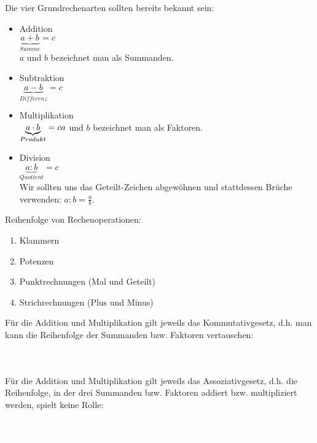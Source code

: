 Die vier Grundrechenarten sollten bereits bekannt sein:
\begin{tcolorbox}
	\begin{itemize}
		\item Addition\\\textcolor{loestc}{\(\underbrace{a+b}_{Summe}=c\)\\\(a\) und \(b\) bezeichnet man als Summanden.}
		\item Subtraktion\\\textcolor{loestc}{\(\underbrace{a-b}_{Differenz}=c\)}
		\item Multiplikation\\\textcolor{loestc}{\(\underbrace{a\cdot b}_{Produkt}=c$\\\(a\) und \(b\) bezeichnet man als Faktoren.}
		\item Division\\\textcolor{loestc}{\(\underbrace{a:b}_{Quotient}=c\)\\Wir sollten uns das Geteilt-Zeichen abgewöhnen und stattdessen Brüche verwenden: \(a:b=\frac{a}{b}\).}
	\end{itemize}
\end{tcolorbox}
Reihenfolge von Rechenoperationen:
\begin{enumerate}
	\item \textcolor{loes}{Klammern}
	\item \textcolor{loes}{Potenzen}
	\item \textcolor{loes}{Punktrechnungen (Mal und Geteilt)}
	\item \textcolor{loes}{Strichrechnungen (Plus und Minus)}
\end{enumerate}
Für die Addition und Multiplikation gilt jeweils das Kommutativgesetz, d.h. man kann die Reihenfolge der Summanden bzw. Faktoren vertauschen:
\begin{align*}
	\textcolor{loes}{a+b\ }&\textcolor{loes}{=b+a}\\
	\textcolor{loes}{a\cdot b\ }&\textcolor{loes}{=b\cdot a}
\end{align*}
Für die Addition und Multiplikation gilt jeweils das Assoziativgesetz, d.h. die Reihenfolge, in der drei Summanden bzw. Faktoren addiert bzw. multipliziert werden, spielt keine Rolle:
\begin{align*}
	\textcolor{loes}{\left( a+b\right) +c\ }&\textcolor{loes}{=a+\left( b+c\right) }\\
	\textcolor{loes}{\left( a\cdot b\right) \cdot c\ }&\textcolor{loes}{=a\cdot\left( b\cdot c\right) }
\end{align*}
